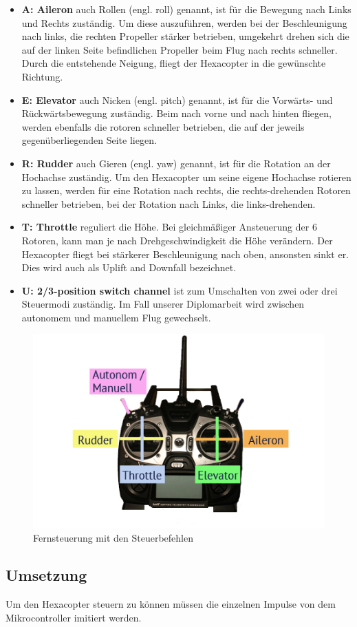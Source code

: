       \begin{itemize}
        \item \textbf{A: Aileron} auch Rollen (engl. roll) genannt, ist für die Bewegung nach Links und Rechts zuständig.
        Um diese auszuführen, werden bei der Beschleunigung nach links, die rechten Propeller stärker betrieben, umgekehrt drehen sich die auf der linken Seite befindlichen Propeller beim Flug nach rechts schneller. Durch die entstehende Neigung, fliegt der Hexacopter in die gewünschte Richtung.
        \item \textbf{E: Elevator} auch Nicken (engl. pitch) genannt, ist für die Vorwärts- und Rückwärtsbewegung zuständig.
        Beim nach vorne und nach hinten fliegen, werden ebenfalls die rotoren schneller betrieben, die auf der jeweils gegenüberliegenden Seite liegen.
        \item \textbf{R: Rudder} auch Gieren (engl. yaw) genannt, ist für die Rotation an der Hochachse zuständig.
        Um den Hexacopter um seine eigene Hochachse rotieren zu lassen, werden für eine Rotation nach rechts, die rechts-drehenden Rotoren schneller betrieben, bei der Rotation nach Links, die links-drehenden.
        \item \textbf{T: Throttle} reguliert die Höhe.
        Bei gleichmäßiger Ansteuerung der 6 Rotoren, kann man je nach Drehgeschwindigkeit die Höhe verändern. Der Hexacopter fliegt bei stärkerer Beschleunigung nach oben, ansonsten sinkt er. Dies wird auch als Uplift and Downfall bezeichnet.
        \item \textbf{U: 2/3-position switch channel} ist zum Umschalten von zwei oder drei Steuermodi zuständig. Im Fall unserer Diplomarbeit wird zwischen autonomem und manuellem Flug gewechselt. \cite{positionswitch}
      \end{itemize}

    \begin{figure}[tbh]
      \begin{centering}
        \includegraphics[width = \textwidth]{Bilder/bor_fernbedienung}
      \par\end{centering}
      \caption{Fernsteuerung mit den Steuerbefehlen}
      \label{Fernsteuerung}
    \end{figure}

  \subsection{Umsetzung}
  Um den Hexacopter steuern zu können müssen die einzelnen Impulse von dem Mikrocontroller imitiert werden.